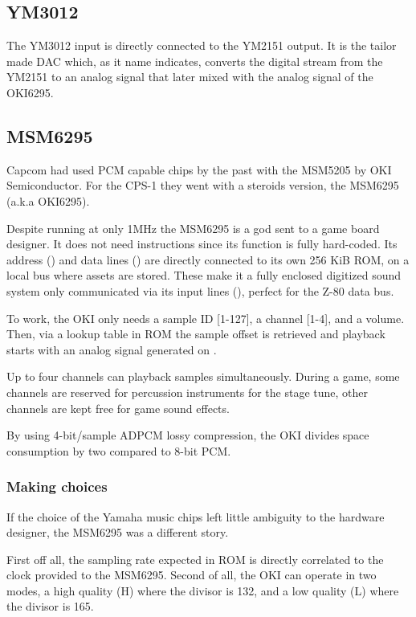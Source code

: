 \subsection{YM3012}
The YM3012 input is directly connected to the YM2151 output. It is the tailor made DAC which, as it name indicates, converts the digital stream from the YM2151 to an analog signal that later mixed with the analog signal of the OKI6295.

\subsection{MSM6295}
Capcom had used PCM capable chips by the past with the MSM5205 by OKI Semiconductor. For the CPS-1  they went with a steroids version, the MSM6295 (a.k.a OKI6295). 

Despite running at only 1MHz the MSM6295 is a god sent to a game board designer. It does not need instructions since its function is fully hard-coded. Its address () and data lines () are directly connected to its own 256 KiB ROM, on a local bus where assets are stored. These make it a fully enclosed digitized sound system only communicated via its input lines (), perfect for the Z-80 data bus.

To work, the OKI only needs a sample ID [1-127], a channel [1-4], and a volume. Then, via a lookup table in ROM the sample offset is retrieved and playback starts with an analog signal generated on . 


Up to four channels can playback samples simultaneously. During a game, some channels are reserved for percussion instruments for the stage tune, other channels are kept free for game sound effects.

 By using 4-bit/sample ADPCM lossy compression, the OKI divides space consumption by two compared to 8-bit PCM. 


\subsubsection{Making choices}
If the choice of the Yamaha music chips left little ambiguity to the hardware designer, the MSM6295 was a different story.

First off all, the sampling rate expected in ROM is directly correlated to the clock provided to the MSM6295. Second of all, the OKI can operate in two modes, a high quality (H) where the divisor is 132, and a low quality (L) where the divisor is 165.

